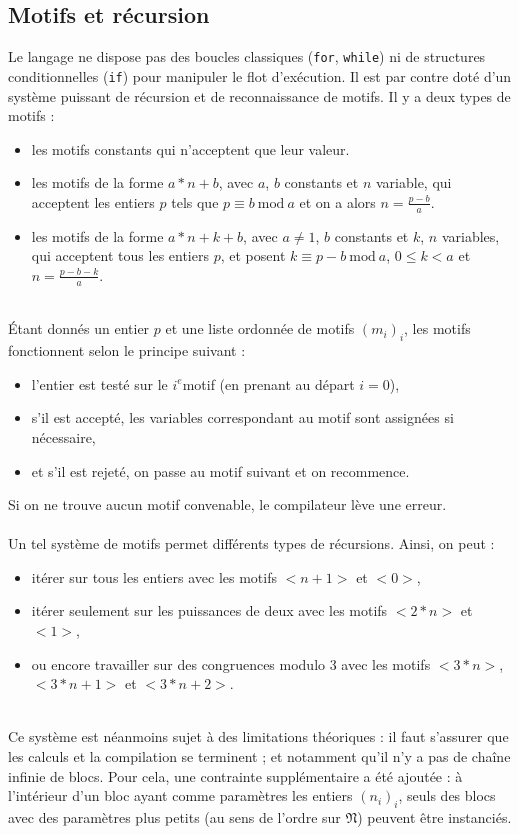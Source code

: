 \documentclass[13pt]{article}
\begin{document}
\subsection{Motifs et récursion}
Le langage ne dispose pas des boucles classiques (\texttt{for}, \texttt{while})
ni de structures conditionnelles (\texttt{if}) pour manipuler le flot d'exécution. Il est par
contre doté d'un système puissant de récursion et de reconnaissance de motifs.
Il y a deux types de motifs :
\begin{itemize}
\item les motifs constants qui n'acceptent que leur valeur. 
\item les motifs de la forme $ a*n + b $, avec $a$, $b$ constants et $n$
  variable, qui acceptent les entiers $p$  tels que $p \equiv b\
  \text{mod}\ a$ et on a alors $n = \frac{p - b}{a}$.
\item les motifs de la forme $ a*n + k + b $, avec $a \neq 1 $, $b$ constants et
  $k$, $n$ variables, qui acceptent tous les entiers $p$, et posent $k \equiv  p - b\
  \text{mod}\ a$, $0 \leq k < a$ et $n = \frac{p - b - k}{a}$.
\end{itemize}
\text{}\\
Étant donnés un entier $p$ et une liste ordonnée de motifs $(m_i)_i$, les motifs
fonctionnent selon le principe suivant : 
\begin{itemize}
\item l'entier est testé sur le $i^{e}$motif (en prenant au départ $i=0$),
\item s'il est accepté, les variables correspondant au motif sont assignées si
  nécessaire,
\item et s'il est rejeté, on passe au motif suivant et on recommence.
\end{itemize}
Si on ne trouve aucun motif convenable, le compilateur lève une erreur.
\text{}\\
\text{}\\
Un tel système de motifs permet différents types de récursions. Ainsi, on peut :
\begin{itemize}
\item itérer sur tous les entiers avec les motifs $<n+1>$ et $<0>$,
\item itérer seulement sur les puissances de deux avec les motifs $<2*n>$ et $<1>$,
\item ou encore travailler sur des congruences modulo 3 avec les motifs $<3*n>$, $<3*n +
  1>$ et $<3*n + 2>$.
\end{itemize}
\text{}\\
Ce système est néanmoins sujet à des limitations théoriques : il faut s'assurer
que les calculs et la compilation se terminent ; et notamment qu'il n'y a pas de
chaîne infinie de blocs. Pour cela, une contrainte supplémentaire a été ajoutée
: à l'intérieur d'un bloc ayant comme paramètres les entiers $(n_i)_i$, seuls
des blocs avec des paramètres plus petits (au sens de l'ordre sur
$\mathfrak{N}$) peuvent être instanciés.
\end{document}
